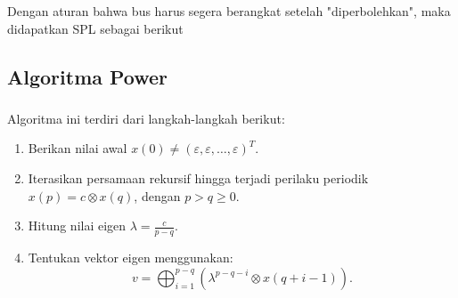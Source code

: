 \documentclass[aspectratio=169]{beamer}
\theoremstyle{definition}
\numberwithin{definisi}{subsection}
\begin{document}
    \begin{frame}
        \frametitle{\insertsubsection}
        Dengan aturan bahwa bus harus segera berangkat setelah "diperbolehkan", maka didapatkan SPL sebagai berikut    
    \end{frame}

    \subsection{Algoritma Power}
    \begin{frame}
        \frametitle{\insertsubsection}
        Algoritma ini terdiri dari langkah-langkah berikut: 
        \begin{enumerate}
             \item Berikan nilai awal \( x(0) \neq (\varepsilon, \varepsilon, \dots, \varepsilon)^T \).
                \item Iterasikan persamaan rekursif hingga terjadi perilaku periodik \( x(p) = c \otimes x(q) \), dengan \( p > q \geq 0 \).
                \item Hitung nilai eigen \( \lambda = \frac{c}{p-q} \).
                \item Tentukan vektor eigen menggunakan:
                \[
                v = \bigoplus_{i=1}^{p-q} \left( \lambda^{p-q-i} \otimes x(q+i-1) \right).
                \]
        \end{enumerate}
    \end{frame}
    
\end{document}
